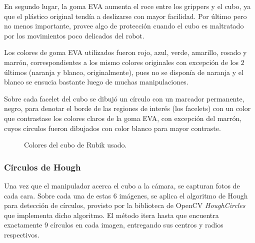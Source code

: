 En segundo lugar, la goma EVA aumenta el roce entre los grippers y el cubo, ya que el plástico original tendía a deslizarse con mayor facilidad. Por último pero no menos importante, provee algo de protección cuando el cubo es maltratado por los movimientos poco delicados del robot.

Los colores de goma EVA utilizados fueron rojo, azul, verde, amarillo, rosado y marrón, correspondientes a los mismo colores originales con excepción de los $2$ últimos (naranja y blanco, originalmente), pues no se disponía de naranja y  el blanco se ensucia bastante luego de muchas manipulaciones.

Sobre cada facelet del cubo se dibujó un círculo con un marcador permanente, negro, para denotar el borde de las regiones de interés (los facelets) con un color que contrastase los colores claros de la goma EVA, con excepción del marrón, cuyos círculos fueron dibujados con color blanco para mayor contraste.

\begin{figure}[h!]
	\centering
	\hfill
	\hfill
	\hfill
	\caption{Colores del cubo de Rubik usado.}
	\label{colorescubo}
\end{figure}

\subsubsection{Círculos de Hough}
Una vez que el manipulador acerca el cubo a la cámara, se capturan fotos de cada cara. Sobre cada una de estas $6$ imágenes, se aplica el algoritmo de Hough para detección de círculos, provisto por la biblioteca de OpenCV \textit{HoughCircles} que implementa dicho algoritmo. El método itera hasta que encuentra exactamente $9$ círculos en cada imagen, entregando sus centros y radios respectivos.


